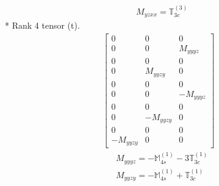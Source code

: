 \documentclass[fleqn,8pt,landscape]{jsarticle}
\begin{document}
\begin{align*}
& M_{yzxx} = \mathbb{T}_{3c}^{(3)}
\end{align*}
* Rank 4 tensor (t).
\begin{align*}
\begin{bmatrix} 0 & 0 & 0 \\ 0 & 0 & M_{yyyz} \\ 0 & 0 & 0 \\ 0 & M_{yyzy} & 0 \\ 0 & 0 & 0 \\ 0 & 0 & - M_{yyyz} \\ 0 & 0 & 0 \\ 0 & - M_{yyzy} & 0 \\ 0 & 0 & 0 \\ - M_{yyzy} & 0 & 0 \end{bmatrix}
\end{align*}
\begin{align*}
& M_{yyyz} = - \mathbb{M}_{4s}^{(1)} - 3 \mathbb{T}_{3c}^{(1)} \\
& M_{yyzy} = - \mathbb{M}_{4s}^{(1)} + \mathbb{T}_{3c}^{(1)}
\end{align*}
\end{document}
